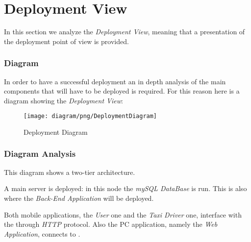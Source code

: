 \newpage

\section{Deployment View} %
\label{sec:deployment_view}

In this section we analyze the \emph{Deployment View}, meaning that a presentation of the deployment point of view is provided.

\subsubsection{Diagram} %
\label{ssub:diagram}

In order to have a successful deployment an in depth analysis of the main components that will have to be deployed is required.
For this reason here is a diagram showing the \emph{Deployment View}:
\newpage
\begin{figure}[h!t]
\caption{Deployment Diagram}
\texttt{[image: diagram/png/DeploymentDiagram]}
\centering
\end{figure}
\newpage


\subsubsection{Diagram Analysis} %
\label{ssub:diagram_analysis}

This diagram shows a two-tier architecture.

A main server is deployed: in this node the \emph{mySQL DataBase} is run. This is also where the \emph{Back-End Application} will be deployed. 

Both mobile applications, the \emph{User} one and the \emph{Taxi Driver} one, interface with the \emph{} through \emph{HTTP} protocol.
Also the PC application, namely the \emph{Web Application}, connects to \emph{}.
